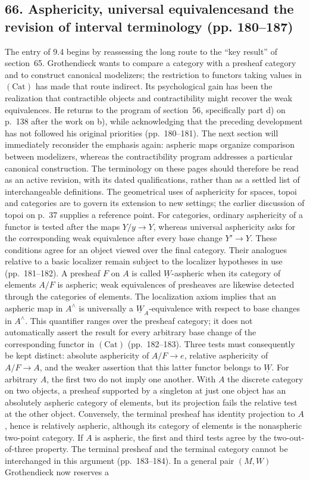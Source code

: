 \documentclass[10pt,oneside]{book}
\begin{document}
\subsection*{66. Asphericity, universal equivalences\newline and the revision of interval terminology (pp. 180--187)}
The entry of 9.4 begins by reassessing the long route to the ``key result'' of section~65. Grothendieck wants to compare a category with a presheaf category and to construct canonical modelizers; the restriction to functors taking values in $(\mathrm{Cat})$ has made that route indirect. Its psychological gain has been the realization that contractible objects and contractibility might recover the weak equivalences. He returns to the program of section~56, specifically part d) on p.~138 after the work on b), while acknowledging that the preceding development has not followed his original priorities (pp.~180--181). The next section will immediately reconsider the emphasis again: aspheric maps organize comparison between modelizers, whereas the contractibility program addresses a particular canonical construction. The terminology on these pages should therefore be read as an active revision, with its dated qualifications, rather than as a settled list of interchangeable definitions. The geometrical uses of asphericity for spaces, topoi and categories are to govern its extension to new settings; the earlier discussion of topoi on p.~37 supplies a reference point. For categories, ordinary asphericity of a functor is tested after the maps $Y/y\to Y$, whereas universal asphericity asks for the corresponding weak equivalence after every base change $Y'\to Y$. These conditions agree for an object viewed over the final category. Their analogues relative to a basic localizer remain subject to the localizer hypotheses in use (pp.~181--182). A presheaf $F$ on $A$ is called $\underline W$-aspheric when its category of elements $A/F$ is aspheric; weak equivalences of presheaves are likewise detected through the categories of elements. The localization axiom implies that an aspheric map in $A^\wedge$ is universally a $\underline W_A$-equivalence with respect to base changes in $A^\wedge$. This quantifier ranges over the presheaf category; it does not automatically assert the result for every arbitrary base change of the corresponding functor in $(\mathrm{Cat})$ (pp.~182--183). Three tests must consequently be kept distinct: absolute asphericity of $A/F\to e$, relative asphericity of $A/F\to A$, and the weaker assertion that this latter functor belongs to $\underline W$. For arbitrary $A$, the first two do not imply one another. With $A$ the discrete category on two objects, a presheaf supported by a singleton at just one object has an absolutely aspheric category of elements, but its projection fails the relative test at the other object. Conversely, the terminal presheaf has identity projection to $A$, hence is relatively aspheric, although its category of elements is the nonaspheric two-point category. If $A$ is aspheric, the first and third tests agree by the two-out-of-three property. The terminal presheaf and the terminal category cannot be interchanged in this argument (pp.~183--184). In a general pair $(M,W)$ Grothendieck now reserves a 
\end{document}
